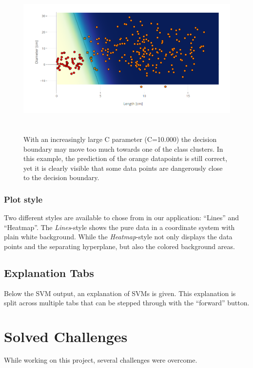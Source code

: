 \documentclass[parskip=half]{scrartcl}
\begin{document}
\begin{figure}
	\centering
	\includegraphics[height=8cm]{SalmonLin75_10k}
	\caption{With an increasingly large C parameter (C=10.000) the decision boundary may move too much towards one of the class clusters. In this example, the prediction of the orange datapoints is still correct, yet it is clearly visible that some data points are dangerously close to the decision boundary.}%
	\label{fig:largec}%
\end{figure}

\subsubsection*{Plot style}
Two different styles are available to chose from in our application: “Lines” and “Heatmap”. The \textit{Lines}-style shows the pure data in a coordinate system with plain white background. While the \textit{Heatmap}-style not only displays the data points and the separating hyperplane, but also the colored background areas.

\subsection{Explanation Tabs}

Below the SVM output, an explanation of SVMs is given.
This explanation is split across multiple tabs
that can be stepped through with the “forward” button.

\newpage
\section{Solved Challenges}

While working on this project, several challenges were overcome.
\end{document}
